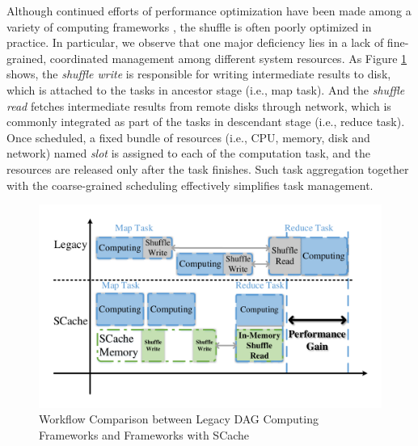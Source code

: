Although continued efforts of performance optimization have been made among a variety of computing frameworks \cite{sync, babu, tachyon, pacman, quincy, delay}, 
the shuffle is often poorly optimized in practice.
In particular, we observe that one major deficiency lies in a lack of fine-grained, coordinated management among different system resources.
As Figure \ref{fig:workflow} shows, the \textit{shuffle write} is responsible for writing intermediate results to disk, which is attached to the tasks in ancestor stage (i.e., map task).  
And the \textit{shuffle read} fetches intermediate results from remote disks through network, which is commonly integrated as part of the tasks in descendant stage (i.e., reduce task). 
Once scheduled, a fixed bundle of resources (i.e., CPU, memory, disk and network) named \textit{slot} is assigned to each of the computation task, and the resources are released only after the task finishes.
Such task aggregation together with the coarse-grained scheduling effectively simplifies task management.
\begin{figure}
	\centering
	\includegraphics[width=\linewidth]{fig/workflow}
	\caption{Workflow Comparison between Legacy DAG Computing Frameworks and Frameworks with SCache}
	\label{fig:workflow}
	\vspace{-1em}
\end{figure}

